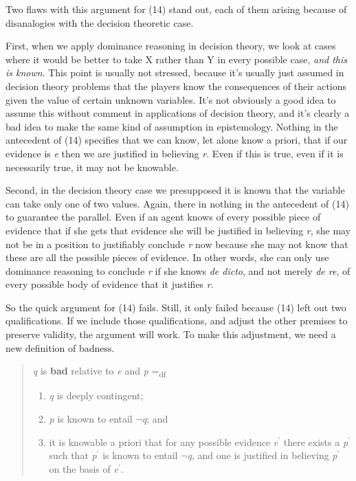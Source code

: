 Two flaws with this argument for (14) stand out, each of them arising because of disanalogies with the decision theoretic case. 

First, when we apply dominance reasoning in decision theory, we look at cases where it would be better to take X rather than Y in every possible case, \textit{and this is known}. This point is usually not stressed, because it's usually just assumed in decision theory problems that the players know the consequences of their actions given the value of certain unknown variables. It's not obviously a good idea to assume this without comment in applications of decision theory, and it's clearly a bad idea to make the same kind of assumption in epistemology. Nothing in the antecedent of (14) specifies that we can know, let alone know a priori, that if our evidence is \textit{e} then we are justified in believing \textit{r}. Even if this is true, even if it is necessarily true, it may not be knowable. 

Second, in the decision theory case we presupposed it is known that the variable can take only one of two values. Again, there in nothing in the antecedent of (14) to guarantee the parallel. Even if an agent knows of every possible piece of evidence that if she gets that evidence she will be justified in believing \textit{r}, she may not be in a position to justifiably conclude \textit{r} now because she may not know that these are all the possible pieces of evidence. In other words, she can only use dominance reasoning to conclude \textit{r} if she knows \textit{de dicto}, and not merely \textit{de re}, of every possible body of evidence that it justifies \textit{r}.

So the quick argument for (14) fails. Still, it only failed because (14) left out two qualifications. If we include those qualifications, and adjust the other premises to preserve validity, the argument will work. To make this adjustment, we need a new definition of badness. 

\begin{quote}
\textit{q} is \textbf{bad} relative to \textit{e} and \textit{p} =\textsubscript{df} 

\begin{enumerate}
\item \textit{q} is deeply contingent;
\item \textit{p} is known to entail \(\neg\)\textit{q}; and 
\item it is knowable a priori that for any possible evidence \textit{e}\(^\prime\) there exists a \textit{p}\(^\prime\) such that \textit{p}\(^\prime\) is known to entail \(\neg\)\textit{q}, and one is justified in believing \textit{p}\(^\prime\) on the basis of \textit{e}\(^\prime\).
\end{enumerate}
\end{quote}

